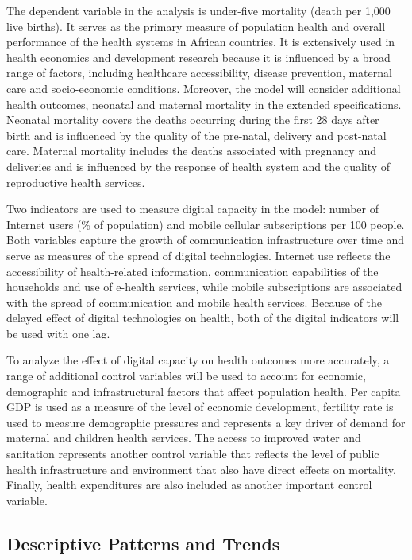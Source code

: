 \documentclass[12pt]{article}
\begin{document}
The dependent variable in the analysis is under-five mortality (death per 1,000 live births). It serves as the primary measure of population health and overall performance of the health systems in African countries. It is extensively used in health economics and development research because it is influenced by a broad range of factors, including healthcare accessibility, disease prevention, maternal care and socio-economic conditions. Moreover, the model will consider additional health outcomes, neonatal and maternal mortality in the extended specifications. Neonatal mortality covers the deaths occurring during the first 28 days after birth and is influenced by the quality of the pre-natal, delivery and post-natal care. Maternal mortality includes the deaths associated with pregnancy and deliveries and is influenced by the response of health system and the quality of reproductive health services.

\medskip
Two indicators are used to measure digital capacity in the model: number of Internet users (\% of population) and mobile cellular subscriptions per 100 people. Both variables capture the growth of communication infrastructure over time and serve as measures of the spread of digital technologies. Internet use reflects the accessibility of health-related information, communication capabilities of the households and use of e-health services, while mobile subscriptions are associated with the spread of communication and mobile health services. Because of the delayed effect of digital technologies on health, both of the digital indicators will be used with one lag.

\medskip
To analyze the effect of digital capacity on health outcomes more accurately, a range of additional control variables will be used to account for economic, demographic and infrastructural factors that affect population health. Per capita GDP is used as a measure of the level of economic development, fertility rate is used to measure demographic pressures and represents a key driver of demand for maternal and children health services. The access to improved water and sanitation represents another control variable that reflects the level of public health infrastructure and environment that also have direct effects on mortality. Finally, health expenditures are also included as another important control variable.

\subsection{Descriptive Patterns and Trends}
\end{document}
